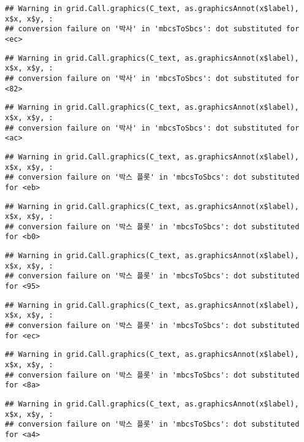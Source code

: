 \documentclass[
]{article}
\begin{document}
\begin{verbatim}
## Warning in grid.Call.graphics(C_text, as.graphicsAnnot(x$label), x$x, x$y, :
## conversion failure on '박사' in 'mbcsToSbcs': dot substituted for <ec>
\end{verbatim}

\begin{verbatim}
## Warning in grid.Call.graphics(C_text, as.graphicsAnnot(x$label), x$x, x$y, :
## conversion failure on '박사' in 'mbcsToSbcs': dot substituted for <82>
\end{verbatim}

\begin{verbatim}
## Warning in grid.Call.graphics(C_text, as.graphicsAnnot(x$label), x$x, x$y, :
## conversion failure on '박사' in 'mbcsToSbcs': dot substituted for <ac>
\end{verbatim}

\begin{verbatim}
## Warning in grid.Call.graphics(C_text, as.graphicsAnnot(x$label), x$x, x$y, :
## conversion failure on '박스 플롯' in 'mbcsToSbcs': dot substituted for <eb>
\end{verbatim}

\begin{verbatim}
## Warning in grid.Call.graphics(C_text, as.graphicsAnnot(x$label), x$x, x$y, :
## conversion failure on '박스 플롯' in 'mbcsToSbcs': dot substituted for <b0>
\end{verbatim}

\begin{verbatim}
## Warning in grid.Call.graphics(C_text, as.graphicsAnnot(x$label), x$x, x$y, :
## conversion failure on '박스 플롯' in 'mbcsToSbcs': dot substituted for <95>
\end{verbatim}

\begin{verbatim}
## Warning in grid.Call.graphics(C_text, as.graphicsAnnot(x$label), x$x, x$y, :
## conversion failure on '박스 플롯' in 'mbcsToSbcs': dot substituted for <ec>
\end{verbatim}

\begin{verbatim}
## Warning in grid.Call.graphics(C_text, as.graphicsAnnot(x$label), x$x, x$y, :
## conversion failure on '박스 플롯' in 'mbcsToSbcs': dot substituted for <8a>
\end{verbatim}

\begin{verbatim}
## Warning in grid.Call.graphics(C_text, as.graphicsAnnot(x$label), x$x, x$y, :
## conversion failure on '박스 플롯' in 'mbcsToSbcs': dot substituted for <a4>
\end{verbatim}
\end{document}
